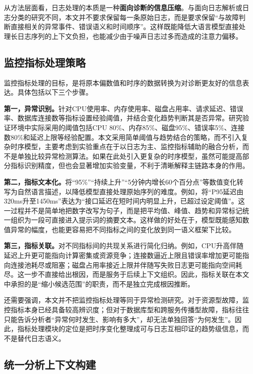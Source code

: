 从方法层面看，日志处理的本质是一种\textbf{面向诊断的信息压缩}。与面向日志解析或日志分类的研究不同，本文并不要求保留每一条原始日志，而是要求保留“与故障判断直接相关的异常事件、错误语义和时间顺序”。这样既能降低大语言模型直接处理长日志序列的上下文负担，也能减少由于噪声日志过多而造成的注意力偏移。

\subsection{监控指标处理策略}

监控指标处理的目标，是将原本偏数值和时序的数据转换为对诊断更友好的信息表达。具体包括以下三个步骤。

\textbf{第一，异常识别。}针对CPU使用率、内存使用率、磁盘占用率、请求延迟、错误率、数据库连接数等指标设置经验阈值，并结合变化趋势判断其是否异常。研究验证环境中实际采用的阈值包括CPU 80\%、内存85\%、磁盘95\%、错误率5\%、连接数80\%和延迟上限等经验配置。本文采用简单阈值与趋势结合的策略，而不引入复杂时序模型，主要考虑到实验重点在于以日志为主、监控指标辅助的融合分析，而不是单独比较异常检测算法。如果在此处引入更复杂的时序模型，虽然可能提高部分指标识别精度，但也会显著增加实验变量，不利于清晰解释主链路本身的作用。

\textbf{第二，指标文本化。}将“95\%”“持续上升”“5分钟内增长60个百分点”等数值变化转写为自然语言描述，以降低模型直接处理原始序列的难度。例如，将“P95延迟由320ms升至1450ms”表达为“接口延迟在短时间内明显上升，已超过设定阈值”。这一过程并不是简单地把数字改写为句子，而是把平均值、峰值、趋势和异常标记统一组织为一段可直接进入提示词的摘要文本。这样做的好处在于，模型既能感知数值异常的幅度，也能更容易把不同指标之间的变化放到同一语义框架下比较。

\textbf{第三，指标关联。}对不同指标间的共现关系进行简化归纳。例如，CPU升高伴随延迟上升更可能指向计算密集或资源竞争；连接数逼近上限且错误率增加更可能指向连接池耗尽或阻塞；磁盘占用率接近上限并伴随写失败日志更可能指向空间耗尽。这一步不直接给出根因，而是服务于后续上下文组织。因此，指标关联在本文中承担的是“缩小候选范围”的职责，而不是独立完成根因推断。

还需要强调，本文并不把监控指标处理等同于异常检测研究。对于资源型故障，监控指标本身已经具备较高辨识度；但对于数据库型和跨服务传播型故障，指标往往只能告诉分析者“异常何时发生、影响有多大”，却无法单独回答“为何发生”。因此，指标处理模块的定位是把时序变化整理成可与日志互相印证的趋势级信息，而不是替代日志语义。

\subsection{统一分析上下文构建}


